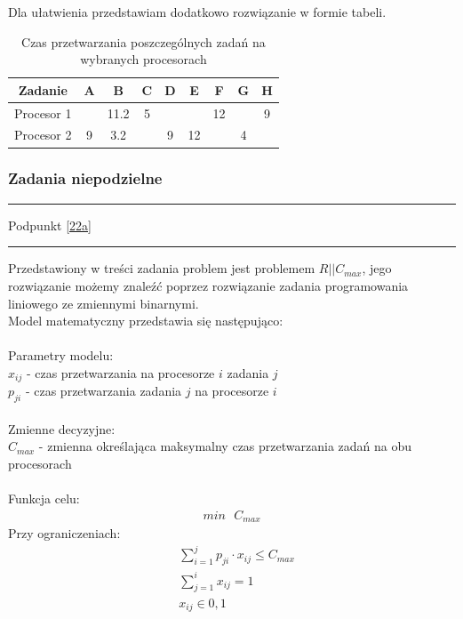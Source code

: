 \documentclass[
    12pt, %
]{../fphw}
\begin{document}
Dla ułatwienia przedstawiam dodatkowo rozwiązanie w formie tabeli.
\begin{table}[H]
    \centering
    \begin{tabular}{| c | c | c | c | c | c | c | c | c |}
        \hline
        Zadanie    & A & B    & C & D & E  & F  & G & H \\
        \hline
        Procesor 1 &   & 11.2 & 5 &   &    & 12 &   & 9 \\
        \hline
        Procesor 2 & 9 & 3.2  &   & 9 & 12 &    & 4 &   \\
        \hline
    \end{tabular}
    \caption{Czas przetwarzania poszczególnych zadań na wybranych procesorach}
\end{table}

\subsubsection{Zadania niepodzielne}

\par\noindent\rule{\textwidth}{0.4pt}
Podpunkt \ref{22a}
\par\noindent\rule{\textwidth}{0.4pt}
Przedstawiony w treści zadania problem jest problemem \(R||C_{max}\),
jego rozwiązanie możemy znaleźć poprzez rozwiązanie zadania programowania liniowego
ze zmiennymi binarnymi. \\
Model matematyczny przedstawia się następująco: \\ \\
Parametry modelu: \\
\(x_{ij}\) - czas przetwarzania na procesorze \(i\) zadania \(j\) \\
\(p_{ji}\) - czas przetwarzania zadania \(j\) na procesorze \(i\) \\ \\
Zmienne decyzyjne: \\
\(C_{max}\) - zmienna określająca maksymalny czas przetwarzania zadań na obu procesorach \\ \\
Funkcja celu: \\
\begin{align*}
    min \text{ } C_{max}
\end{align*}
Przy ograniczeniach: \\
\begin{align*}
     & \sum^j_{i=1} p_{ji} \cdot x_{ij} \leq C_{max} \\
     & \sum^i_{j=1} x_{ij} = 1                       \\
     & x_{ij} \in 0,1                                \\
\end{align*}
\end{document}
